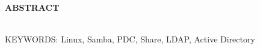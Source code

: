 \begin{center}
\textbf{ABSTRACT}
\end{center}

\singlespacing

\noindent  \\

\noindent KEYWORDS: Linux, Samba, PDC, Share, LDAP, Active Directory